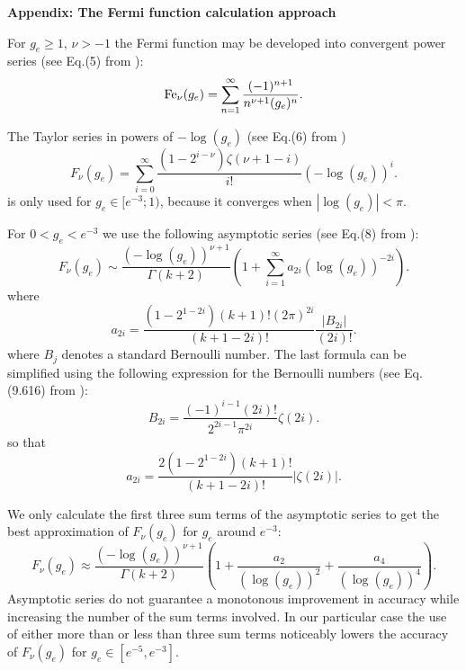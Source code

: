 
{\bf\Large Appendix: The Fermi function calculation approach}

For $g_e\ge1,\,\nu>-1$ the Fermi function may be developed into
convergent power series (see Eq.(5) from \cite{mcleod}):
\begin{equation}
{\rm Fe}_\nu(g_e)=\sum_{n=1}^\infty{\frac{(-1)^{n+1}}{n^{\nu+1}(g_e)^n}}.
\end{equation} 

The Taylor series in powers of $-\log(g_e)$ (see Eq.(6) from \cite{mcleod}) %
\begin{equation}
F_{\nu}(g_e) = \sum_{i=0}^\infty{\frac{(1-2^{i-\nu}) \zeta(\nu+1-i)}{i!} (-\log(g_e))^i}.
\end{equation}
is only used for $g_e \in [e^{-3}; 1)$, because it converges when $|\log(g_e)| < \pi$.

For $0 < g_e < e^{-3}$ we use the following asymptotic series (see Eq.(8) from \cite{mcleod}): %
\begin{equation}
F_{\nu}(g_e) \sim \frac{(-\log(g_e))^{\nu+1}}{\Gamma(k+2)} \left(1 + \sum_{i=1}^\infty{a_{2i} (\log(g_e))^{-2i}}\right).
\end{equation}
where
\begin{equation}
a_{2i} = \frac{(1 - 2^{1-2i})(k+1)!(2\pi)^{2i}}{(k+1-2i)!} \frac{|B_{2i}|}{(2i)!}.
\end{equation}
where $B_j$ denotes a standard Bernoulli number. The last formula can be simplified using the following expression for the Bernoulli numbers (see Eq.(9.616) from \cite{gradshtein}):
\begin{equation}
B_{2i} = \frac{(-1)^{i-1} (2i)!}{2^{2i-1} \pi^{2i}} \zeta(2i).
\end{equation}
so that
\begin{equation}
a_{2i} = \frac{2 (1 - 2^{1-2i}) (k+1)!}{(k+1-2i)!} |\zeta(2i)|.
\end{equation}

We only calculate the first three sum terms of the asymptotic series to get the best
approximation of $F_\nu(g_e)$ for $g_e$ around $e^{-3}$:
\begin{equation}
F_\nu(g_e) \approx \frac{(-\log(g_e))^{\nu+1}}{\Gamma(k+2)} \left(1 + \frac{a_2}{(\log(g_e))^2} + \frac{a_4}{(\log(g_e))^4}\right).
\end{equation}
Asymptotic series do not guarantee a monotonous improvement in accuracy while increasing the number of the sum terms
involved. In our particular case the use of either more than or less than three sum
terms noticeably lowers the accuracy of $F_\nu(g_e)$ for $g_e \in [e^{-5}, e^{-3}]$.

